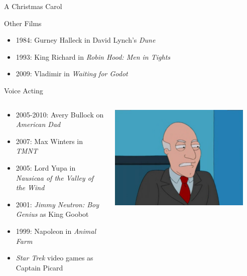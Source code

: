 \documentclass[xcolor=dvipsnames]{beamer}
\begin{document}
\begin{frame}{A Christmas Carol}

\end{frame}

\begin{frame}{Other Films}
  \begin{itemize}
    \item 1984: Gurney Halleck in David Lynch's \emph{Dune}
    \item 1993: King Richard in \emph{Robin Hood: Men in Tights}
    \item 2009: Vladimir in \emph{Waiting for Godot}
  \end{itemize}
\end{frame}

\begin{frame}{Voice Acting}
  \begin{columns}
    \begin{column}{0.7\textwidth}
      \begin{itemize} 
        \item 2005-2010: Avery Bullock on \emph{American Dad}
        \item 2007: Max Winters in \emph{TMNT}
        \item 2005: Lord Yupa in \emph{Nausicaa of the Valley of the Wind}
        \item 2001: \emph{Jimmy Neutron: Boy Genius} as King Goobot
        \item 1999: Napoleon in \emph{Animal Farm}
        \item \emph{Star Trek} video games as Captain Picard
      \end{itemize}
    \end{column}
    \begin{column}{0.3\textwidth}
      \includegraphics[width=0.9\textwidth]{Bullock.jpg}
    \end{column}
  \end{columns}
\end{frame}
\end{document}
